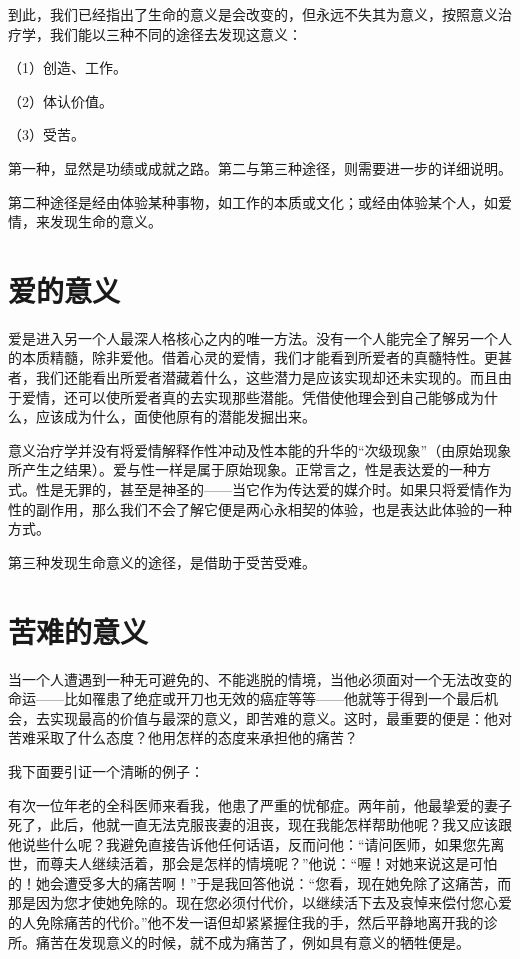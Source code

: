 \documentclass[11pt,oneside]{book}
\begin{document}
\begin{common-format}
到此，我们已经指出了生命的意义是会改变的，但永远不失其为意义，按照意义治疗学，我们能以三种不同的途径去发现这意义：

（1）创造、工作。

（2）体认价值。

（3）受苦。

第一种，显然是功绩或成就之路。第二与第三种途径，则需要进一步的详细说明。

第二种途径是经由体验某种事物，如工作的本质或文化；或经由体验某个人，如爱情，来发现生命的意义。


\section{爱的意义}
爱是进入另一个人最深人格核心之内的唯一方法。没有一个人能完全了解另一个人的本质精髓，除非爱他。借着心灵的爱情，我们才能看到所爱者的真髓特性。更甚者，我们还能看出所爱者潜藏着什么，这些潜力是应该实现却还未实现的。而且由于爱情，还可以使所爱者真的去实现那些潜能。凭借使他理会到自己能够成为什么，应该成为什么，面使他原有的潜能发掘出来。

意义治疗学并没有将爱情解释作性冲动及性本能的升华的“次级现象”（由原始现象所产生之结果）。爱与性一样是属于原始现象。正常言之，性是表达爱的一种方式。性是无罪的，甚至是神圣的——当它作为传达爱的媒介时。如果只将爱情作为性的副作用，那么我们不会了解它便是两心永相契的体验，也是表达此体验的一种方式。

第三种发现生命意义的途径，是借助于受苦受难。


\section{苦难的意义}
当一个人遭遇到一种无可避免的、不能逃脱的情境，当他必须面对一个无法改变的命运——比如罹患了绝症或开刀也无效的癌症等等——他就等于得到一个最后机会，去实现最高的价值与最深的意义，即苦难的意义。这时，最重要的便是：他对苦难采取了什么态度？他用怎样的态度来承担他的痛苦？

我下面要引证一个清晰的例子：

有次一位年老的全科医师来看我，他患了严重的忧郁症。两年前，他最挚爱的妻子死了，此后，他就一直无法克服丧妻的沮丧，现在我能怎样帮助他呢？我又应该跟他说些什么呢？我避免直接告诉他任何话语，反而问他：“请问医师，如果您先离世，而尊夫人继续活着，那会是怎样的情境呢？”他说：“喔！对她来说这是可怕的！她会遭受多大的痛苦啊！”于是我回答他说：“您看，现在她免除了这痛苦，而那是因为您才使她免除的。现在您必须付代价，以继续活下去及哀悼来偿付您心爱的人免除痛苦的代价。”他不发一语但却紧紧握住我的手，然后平静地离开我的诊所。痛苦在发现意义的时候，就不成为痛苦了，例如具有意义的牺牲便是。


\end{common-format}
\end{document}
